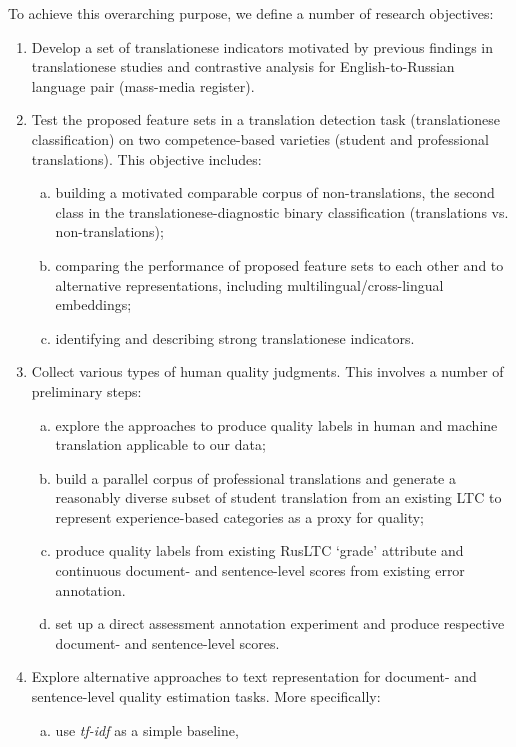 To achieve this overarching purpose, we define a number of research objectives:
\begin{enumerate}\compresslist{}
	\item Develop a set of translationese indicators motivated by previous findings in translationese studies and contrastive analysis for English-to-Russian language pair (mass-media register).
	\item Test the proposed feature sets in a translation detection task (translationese classification) on two competence-based varieties (student and professional translations). This objective includes:
	\begin{enumerate}[(a)]\compresslist{}
		\item building a motivated comparable corpus of non-translations, the second class in the translationese-diagnostic binary classification (translations vs. non-translations); 
		\item comparing the performance of proposed feature sets to each other and to alternative representations, including multilingual/cross-lingual embeddings;
		\item identifying and describing strong translationese indicators.
	\end{enumerate}
	\item Collect various types of human quality judgments. This involves a number of preliminary steps:
	\begin{enumerate}[(a)]
		\item explore the approaches to produce quality labels in human and machine translation applicable to our data;
		\item build a parallel corpus of professional translations and generate a reasonably diverse subset of student translation from an existing \gls{LTC} to represent experience-based categories as a proxy for quality;
		\item produce quality labels from existing \gls{RusLTC} `grade' attribute and continuous document- and sentence-level scores from existing error annotation.
		\item set up a direct assessment annotation experiment and produce respective document- and sentence-level scores.
	\end{enumerate} 
	\item Explore alternative approaches to text representation for document- and sentence-level quality estimation tasks. More specifically:
	\begin{enumerate}[(a)]
		\item use \textit{tf-idf} as a simple baseline,

\end{enumerate}
\end{enumerate}
